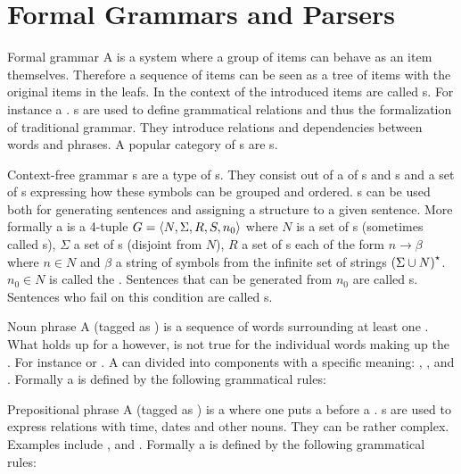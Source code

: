 \section{Formal Grammars and Parsers}
\begin{df}{Formal grammar}
A \sb{} is a system where a group of items can behave as an item themselves. Therefore a sequence of items can be seen as a tree of items with the original items in the leafs. In the context of \nlp{} the introduced items are called s. For instance a . \sb{}s are used to define grammatical relations and thus the formalization of traditional grammar. They introduce relations and dependencies between words and phrases. A popular category of \sb{}s are s.
\end{df}
\begin{df}{Context-free grammar}
\sb{}s are a type of s. They consist out of a  of s and s and a set of s expressing how these symbols can be grouped and ordered. \sb{}s can be used both for generating sentences and assigning a structure to a given sentence. More formally a \sb{} is a 4-tuple $G=\left\langle N,\Sigma,R,S,n_0\right\rangle$ where $N$ is a set of s (sometimes called s), $\Sigma$ a set of s (disjoint from $N$), $R$ a set of s each of the form $n\rightarrow\beta$ where $n\in N$ and $\beta$ a string of symbols from the infinite set of strings $\left(\Sigma\cup N\right)^{\star}$. $n_0\in N$ is called the . Sentences that can be generated from $n_0$ are called s. Sentences who fail on this condition are called s.
\end{df}
\begin{df}[NP]{Noun phrase}
A \sb{} (tagged as ) is a sequence of words surrounding at least one . What holds up for a \sb{} however, is not true for the individual words making up the \sb{}. For instance  or . A \sb{} can divided into components with a specific meaning: , ,  and . Formally a \sb{} is defined by the following grammatical rules: 
\end{df}
\begin{df}[PP]{Prepositional phrase}
A \sb{} (tagged as ) is a  where one puts a  before a . \sb{}s are used to express relations with time, dates and other nouns. They can be rather complex. Examples include ,  and . Formally a \sb{} is defined by the following grammatical rules: 
\end{df}
